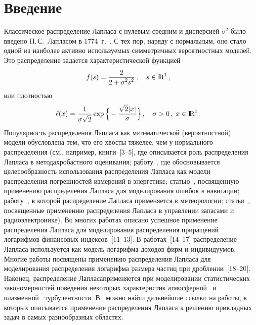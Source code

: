       \begin{multicols}{2}

      \label{st\stat}

\section{Введение}

Классическое распределение Лапласа с нулевым средним и дисперсией
$\sigma^2$ было введено П.\,С.~Лапласом в 1774~г.~\cite{45be}. С тех
пор, наряду с нормальным, оно стало одной из наиболее активно
использу\-емых симметричных вероятностных моделей. Это распределение
задается характеристической функцией
$$
f(s)=\displaystyle\frac{\displaystyle 2\mathstrut}{\displaystyle 2+\sigma^2s^2\mathstrut}\,,\quad s\in{\rm I\hspace{-0.7mm}\rm R}^1\,,
$$
или плотностью
$$
\ell(x)=\displaystyle\frac{\displaystyle 1\mathstrut}{\displaystyle \sigma\sqrt{2}\mathstrut}\exp\Big\{-\displaystyle\frac{\displaystyle \sqrt{2}|x|\mathstrut}{\displaystyle \sigma\mathstrut}\Big\}\,,\quad
\sigma>0\,,\ x\in{\rm I\hspace{-0.7mm}\rm R}^1\,.
$$
Популярность распределения
Лапласа как математической (вероятностной) модели обусловлена тем,
что его хвосты тяжелее, чем у нормального рас\-пределения (см.,
например, книги~[3--5], где описывается роль
распределения Лапласа в методах\linebreak робастного оценивания; работу~\cite{30be},
где обосновывается целесообразность использования
распределения Лапласа как модели распределения\linebreak
 погрешностей
измерений в энергетике; статью~\cite{37be}, посвященную применению
распределения Лапласа для моделирования ошибок в навигации; работу~\cite{48be},
в которой распределение Лапласа применяется в метеорологии;
статьи~\cite{21be, 28be}, посвященные применению распределения Лапласа в
управлении запасами и радиоэлектронике). Во многих работах описано
успешное применение распределения Лап\-ла\-са для моделирования
распределения приращений логарифмов финансовых
индексов~[11--13].
В работах~[14--17] распределение Лапласа
используется как модель логарифма доходов фирм и индивидуумов.
Многие работы посвящены применению распределения Лапласа для
моделирования распределения логарифма размера частиц
при дроб\-ле\-нии~[18--20].
Наконец, распределение Лапласа\linebreak применяется при
моделировании статистических закономерностей поведения некоторых
характе\-ристик атмосферной~\cite{24be} и плазменной~\cite{11be} турбулентности.
В~\cite{39be, 43be} можно найти дальнейшие ссылки на работы, в
которых описывается применение распределения Лапласа к решению
прикладных задач в самых разнообразных областях.



\end{multicols}
